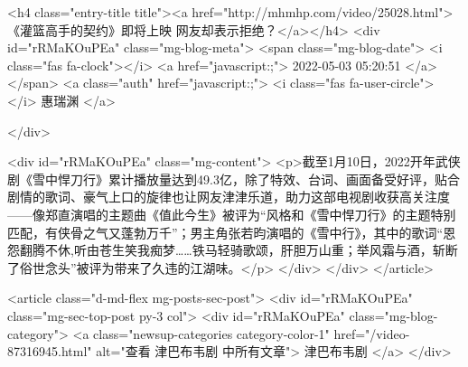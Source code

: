                                             <h4 class="entry-title title"><a href="http://mhmhp.com/video/25028.html">《灌篮高手的契约》即将上映 网友却表示拒绝？</a></h4>
                                            <div id="rRMaKOuPEa"  class="mg-blog-meta">
                                                <span class="mg-blog-date">
                                                    <i class="fas fa-clock"></i>
                                                    <a href="javascript:;">
                                                        2022-05-03 05:20:51
                                                    </a>
                                                </span>
                                                <a class="auth" href="javascript:;">
                                                    <i class="fas fa-user-circle"></i>
                                                    惠瑞渊
                                                </a>

                                            </div>


                                            <div id="rRMaKOuPEa"  class="mg-content">
                                                <p>截至1月10日，2022开年武侠剧《雪中悍刀行》累计播放量达到49.3亿，除了特效、台词、画面备受好评，贴合剧情的歌词、豪气上口的旋律也让网友津津乐道，助力这部电视剧收获高关注度——像郑直演唱的主题曲《值此今生》被评为“风格和《雪中悍刀行》的主题特别匹配，有侠骨之气又蓬勃万千”；男主角张若昀演唱的《雪中行》，其中的歌词“恩怨翻腾不休,听由苍生笑我痴梦……铁马轻骑歌颂，肝胆万山重；举风霜与酒，斩断了俗世念头”被评为带来了久违的江湖味。</p>
                                            </div>
                                        </div>
                                    </article>
                                    
                                    <article class="d-md-flex mg-posts-sec-post">
                                        <div id="rRMaKOuPEa"  class="mg-sec-top-post py-3 col">
                                            <div id="rRMaKOuPEa"  class="mg-blog-category">
                                                <a class="newsup-categories category-color-1" href="/video-87316945.html" alt="查看 津巴布韦剧 中所有文章">
                                                    津巴布韦剧
                                                </a>
                                            </div>

